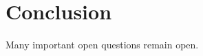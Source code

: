 \documentclass[twocolumn]{article}[10pt]
\begin{document}




\section{Conclusion}
Many important open questions remain open.



\end{document}
